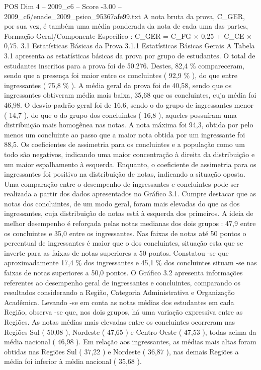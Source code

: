\begin{textsample}{POS Dim 4 – 2009\_c6 – Score -3.00 – 2009\_c6/enade\_2009\_psico\_95367afe99.txt}
A nota bruta da prova, C\_GER, por sua vez, é também uma média ponderada da nota de cada uma das partes, Formação Geral/Componente Específico : C\_GER = C\_FG × 0,25 + C\_CE × 0,75. 3.1 Estatísticas Básicas da Prova 3.1.1 Estatísticas Básicas Gerais A Tabela 3.1 apresenta as estatísticas básicas da prova por grupo de estudantes.
O total de estudantes inscritos para a prova foi de 50.276.
Destes, 82,4 \% compareceram, sendo que a presença foi maior entre os concluintes ( 92,9 \% ), do que entre ingressantes ( 75,8 \% ).
A média geral da prova foi de 40,58, sendo que os ingressantes obtiveram média mais baixa, 35,68 que os concluintes, cuja média foi 46,98.
O desvio-padrão geral foi de 16,6, sendo o do grupo de ingressantes menor ( 14,7 ), do que o do grupo dos concluintes ( 16,8 ), aqueles possuíram uma distribuição mais homogênea nas notas.
A nota máxima foi 94,3, obtida por pelo menos um concluinte ao passo que a maior nota obtida por um ingressante foi 88,5.
Os coeficientes de assimetria para os concluintes e a população como um todo são negativos, indicando uma maior concentração à direita da distribuição e um maior espalhamento à esquerda.
Enquanto, o coeficiente de assimetria para os ingressantes foi positivo na distribuição de notas, indicando a situação oposta.
Uma comparação entre o desempenho de ingressantes e concluintes pode ser realizada a partir dos dados apresentados no Gráfico 3.1.
Cumpre destacar que as notas dos concluintes, de um modo geral, foram mais elevadas do que as dos ingressantes, cuja distribuição de notas está à esquerda dos primeiros.
A ideia de melhor desempenho é reforçada pelas notas medianas dos dois grupos : 47,9 entre os concluintes e 35,0 entre os ingressantes.
Nas faixas de notas até 50 pontos o percentual de ingressantes é maior que o dos concluintes, situação esta que se inverte para as faixas de notas superiores a 50 pontos.
Constatou -se que aproximadamente 17,4 \% dos ingressantes e 45,1 \% dos concluintes situam -se nas faixas de notas superiores a 50,0 pontos.
O Gráfico 3.2 apresenta informações referentes ao desempenho geral de ingressantes e concluintes, comparando os resultados considerando a Região, Categoria Administrativa e Organização Acadêmica.
Levando -se em conta as notas médias dos estudantes em cada Região, observa -se que, nos dois grupos, há uma variação expressiva entre as Regiões.
As notas médias mais elevadas entre os concluintes ocorreram nas Regiões Sul ( 50,08 ), Nordeste ( 47,65 ) e Centro-Oeste ( 47,53 ), todas acima da média nacional ( 46,98 ).
Em relação aos ingressantes, as médias mais altas foram obtidas nas Regiões Sul ( 37,22 ) e Nordeste ( 36,87 ), nas demais Regiões a média foi inferior à média nacional ( 35,68 ).

\end{textsample}
